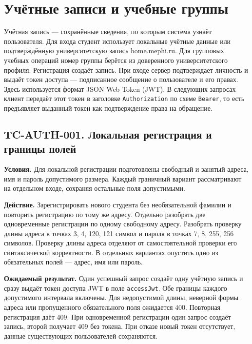 \documentclass[12pt,a4paper]{article}
\begin{document}
\section{Учётные записи и учебные группы}\label{ux443ux447ux451ux442ux43dux44bux435-ux437ux430ux43fux438ux441ux438-ux438-ux443ux447ux435ux431ux43dux44bux435-ux433ux440ux443ux43fux43fux44b}

\hypertarget{учётные-записи-и-учебные-группы}{}

Учётная запись --- сохранённые сведения, по которым система узнаёт пользователя. Для входа студент использует локальные учётные данные или подтверждённую университетскую запись home.mephi.ru. Для групповых учебных операций номер группы берётся из доверенного университетского профиля. Регистрация создаёт запись. При входе сервер подтверждает личность и выдаёт токен доступа --- подписанное сообщение о пользователе и его правах. Здесь используется формат JSON Web Token (JWT). В следующих запросах клиент передаёт этот токен в заголовке \texttt{Authorization} по схеме \texttt{Bearer}, то есть предъявляет выданный токен как подтверждение права на обращение.

\subsection{TC-AUTH-001. Локальная регистрация и границы полей}\label{tc-auth-001-ux43bux43eux43aux430ux43bux44cux43dux430ux44f-ux440ux435ux433ux438ux441ux442ux440ux430ux446ux438ux44f-ux438-ux433ux440ux430ux43dux438ux446ux44b-ux43fux43eux43bux435ux439}

\hypertarget{tc-auth-001-локальная-регистрация-и-границы-полей}{}

\hypertarget{tc-auth-001}{}

\textbf{Условия.} Для локальной регистрации подготовлены свободный и занятый адреса, имя и пароль допустимого размера. Каждый граничный вариант рассматривают на отдельном входе, сохраняя остальные поля допустимыми.

\textbf{Действие.} Зарегистрировать нового студента без необязательной фамилии и повторить регистрацию по тому же адресу. Отдельно разобрать две одновременные регистрации по одному свободному адресу. Разобрать проверку длины адреса в точках 3, 4, 120, 121 символ и пароля в точках 7, 8, 255, 256 символов. Проверку длины адреса отделяют от самостоятельной проверки его синтаксической корректности. В отдельных вариантах опустить одно из обязательных полей --- адрес, имя или пароль.

\textbf{Ожидаемый результат.} Один успешный запрос создаёт одну учётную запись и сразу выдаёт токен доступа JWT в поле \texttt{accessJwt}. Обе границы каждого допустимого интервала включены. Для недопустимой длины, неверной формы адреса или пропущенного обязательного поля ожидается 400. Повторная регистрация даёт 409. При одновременной регистрации один запрос создаёт запись, второй получает 409 без токена. При отказе новый токен отсутствует, данные существующих пользователей сохраняются.
\end{document}
